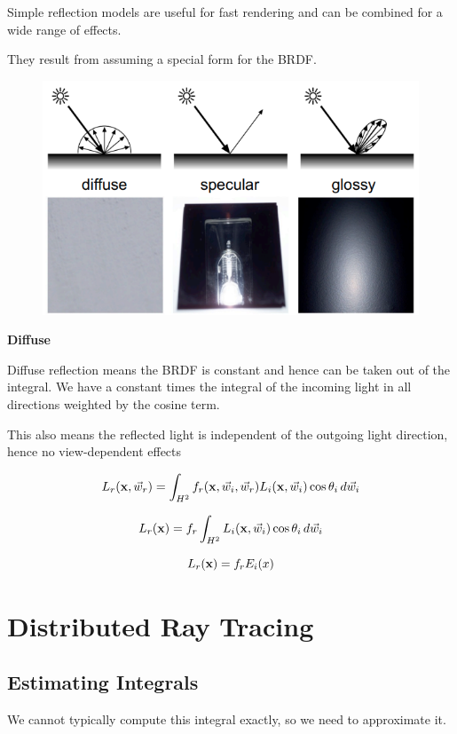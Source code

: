 \documentclass{article}
\begin{document}
Simple reflection models are useful for fast rendering and can be combined for a wide range of effects.

\vspace{5px}

They result from assuming a special form for the BRDF.

\begin{figure}[!ht]
    \centering
    \includegraphics[width=0.5\linewidth]{images/simpler_brdfs.png}
\end{figure}

\textbf{Diffuse}

\vspace{10px}

Diffuse reflection means the BRDF is constant and hence can be taken out of the integral. We have
a constant times the integral of the incoming light in all directions weighted by the cosine term.

\vspace{5px}

This also means the reflected light is independent of the outgoing light direction, hence no 
view-dependent effects

\[
    L_r (\text{\textbf{x}}, \vec{w}_r) = \int_{H^2} f_r(\text{\textbf{x}}, \vec{w}_i, \vec{w}_r)L_i(\text{\textbf{x}}, \vec{w}_i) \cos \theta_i \, d \vec{w}_i
\]

\[
    L_r (\text{\textbf{x}}) = f_r \int_{H^2} L_i(\text{\textbf{x}}, \vec{w}_i) \cos \theta_i \, d \vec{w}_i
\]

\[
    L_r (\text{\textbf{x}}) = f_r E_i (x)
\]

\newpage

\section{Distributed Ray Tracing}

\subsection{Estimating Integrals}

We cannot typically compute this integral exactly, so we need to approximate it.
\end{document}
